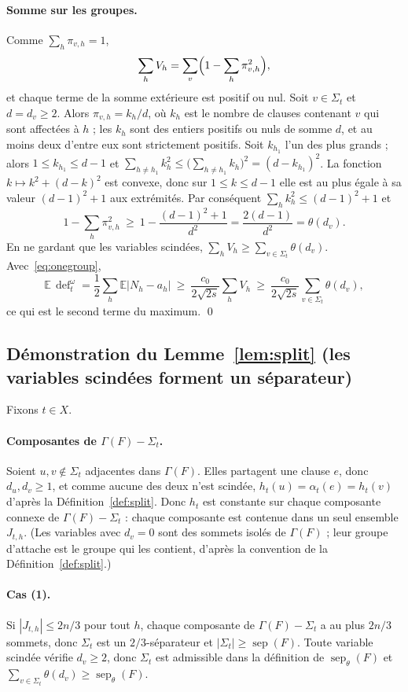 \documentclass[11pt,a4paper]{article}
\theoremstyle{definition}
\theoremstyle{remark}
\newcommand{\E}{\mathbb{E}}
\newcommand{\sep}{\operatorname{sep}}
\newcommand{\sepw}{\operatorname{sep}_{\theta}}
\newcommand{\dfc}{\operatorname{def}}
\newcommand{\Gr}{\Gamma}
\begin{document}
\paragraph{Somme sur les groupes.} Comme $\sum_h\pi_{v,h}=1$,
\[
\sum_hV_h=\sum_v\Bigl(1-\sum_h\pi_{v,h}^2\Bigr),
\]
et chaque terme de la somme extérieure est positif ou nul. Soit $v\in\Sigma_t$ et
$d=d_v\ge2$. Alors $\pi_{v,h}=k_h/d$, où $k_h$ est le nombre de clauses contenant $v$ qui
sont affectées à $h$ ; les $k_h$ sont des entiers positifs ou nuls de somme $d$, et au moins
deux d'entre eux sont strictement positifs. Soit $k_{h_1}$ l'un des plus grands ; alors
$1\le k_{h_1}\le d-1$ et
$\sum_{h\ne h_1}k_h^2\le\bigl(\sum_{h\ne h_1}k_h\bigr)^2=(d-k_{h_1})^2$. La fonction
$k\mapsto k^2+(d-k)^2$ est convexe, donc sur $1\le k\le d-1$ elle est au plus égale à sa
valeur $(d-1)^2+1$ aux extrémités. Par conséquent $\sum_hk_h^2\le(d-1)^2+1$ et
\[
1-\sum_h\pi_{v,h}^2\ \ge\ 1-\frac{(d-1)^2+1}{d^2}=\frac{2(d-1)}{d^2}=\theta(d_v).
\]
En ne gardant que les variables scindées, $\sum_hV_h\ge\sum_{v\in\Sigma_t}\theta(d_v)$.
Avec~\eqref{eq:onegroup},
\[
\E\,\dfc^\omega_t=\frac12\sum_h\E|N_h-a_h|\ \ge\ \frac{c_0}{2\sqrt{2s}}\sum_hV_h
\ \ge\ \frac{c_0}{2\sqrt{2s}}\sum_{v\in\Sigma_t}\theta(d_v),
\]
ce qui est le second terme du maximum. \qed

\subsection{Démonstration du Lemme~\ref{lem:split} (les variables scindées forment un séparateur)}

Fixons $t\in X$.

\paragraph{Composantes de $\Gr(F)-\Sigma_t$.} Soient $u,v\notin\Sigma_t$ adjacentes dans
$\Gr(F)$. Elles partagent une clause $e$, donc $d_u,d_v\ge1$, et comme aucune des deux n'est
scindée, $h_t(u)=\alpha_t(e)=h_t(v)$ d'après la Définition~\ref{def:split}. Donc $h_t$ est
constante sur chaque composante connexe de $\Gr(F)-\Sigma_t$ : chaque composante est
contenue dans un seul ensemble $J_{t,h}$. (Les variables avec $d_v=0$ sont des sommets
isolés de $\Gr(F)$ ; leur groupe d'attache est le groupe qui les contient, d'après la
convention de la Définition~\ref{def:split}.)

\paragraph{Cas (1).} Si $|J_{t,h}|\le2n/3$ pour tout $h$, chaque composante de
$\Gr(F)-\Sigma_t$ a au plus $2n/3$ sommets, donc $\Sigma_t$ est un $2/3$-séparateur et
$|\Sigma_t|\ge\sep(F)$. Toute variable scindée vérifie $d_v\ge2$, donc $\Sigma_t$ est
admissible dans la définition de $\sepw(F)$ et $\sum_{v\in\Sigma_t}\theta(d_v)\ge\sepw(F)$.
\end{document}
